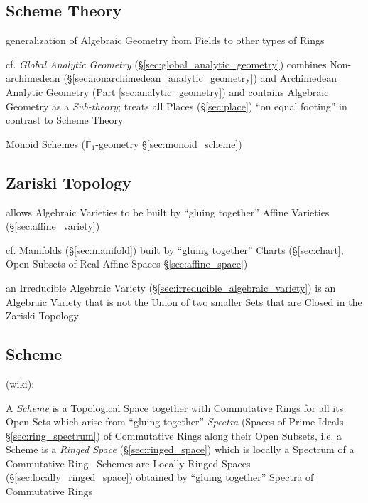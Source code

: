 \begin{itemize}
\begin{itemize}
\section{Scheme Theory}\label{sec:scheme_theory}

generalization of Algebraic Geometry from Fields to other types of Rings

\fist cf. \emph{Global Analytic Geometry} (\S\ref{sec:global_analytic_geometry})
combines Non-archimedean (\S\ref{sec:nonarchimedean_analytic_geometry}) and
Archimedean Analytic Geometry (Part \ref{sec:analytic_geometry}) and contains
Algebraic Geometry as a \emph{Sub-theory}; treats all Places
(\S\ref{sec:place}) ``on equal footing'' in contrast to Scheme Theory

\fist Monoid Schemes ($\mathbb{F}_1$-geometry \S\ref{sec:monoid_scheme})



\subsection{Zariski Topology}\label{sec:zariski_topology}

allows Algebraic Varieties to be built by ``gluing together'' Affine Varieties
 (\S\ref{sec:affine_variety})

cf. Manifolds (\S\ref{sec:manifold}) built by ``gluing together'' Charts
(\S\ref{sec:chart}, Open Subsets of Real Affine Spaces
\S\ref{sec:affine_space})

an Irreducible Algebraic Variety (\S\ref{sec:irreducible_algebraic_variety}) is
an Algebraic Variety that is not the Union of two smaller Sets that are Closed
in the Zariski Topology



\subsection{Scheme}\label{sec:scheme}


(wiki):

A \emph{Scheme} is a Topological Space together with Commutative Rings for all
its Open Sets which arise from ``gluing together'' \emph{Spectra} (Spaces of
Prime Ideals \S\ref{sec:ring_spectrum}) of Commutative Rings along their Open
Subsets, i.e. a Scheme is a \emph{Ringed Space} (\S\ref{sec:ringed_space})
which is locally a Spectrum of a Commutative Ring-- Schemes are Locally Ringed
Spaces (\S\ref{sec:locally_ringed_space}) obtained by ``gluing together''
Spectra of Commutative Rings


\end{itemize}
\end{itemize}

